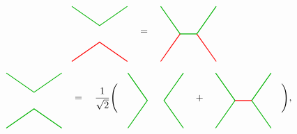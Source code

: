 \documentclass[report,paper=a4, fontsize=12pt, line_length=16cm, number_of_lines=33,dvipdfmx]{jlreq}
\numberwithin{equation}{chapter}
\begin{document}
\begin{align}
    \begin{tikzpicture}[baseline=0]
        \coordinate(A) at (-1,-1);
        \coordinate(B) at (1,-1);
        \coordinate(C) at (1,1);
        \coordinate(D) at (-1,1);
        \draw[darkgreen,thick] (D)--(0,0.3)--(C);
        \draw[red,thick] (A)--(0,-0.3)--(B);
    \end{tikzpicture}
    \quad=
    \quad
    \begin{tikzpicture}[baseline=0]
        \coordinate(A) at (-1,-1);
        \coordinate(B) at (1,-1);
        \coordinate(C) at (1,1);
        \coordinate(D) at (-1,1);
        \draw[darkgreen,thick] (D)--(-0.3,0)--(0.3,0)--(C);
        \draw[red,thick] (A)--(-0.3,0);
        \draw[red,thick] (B)--(0.3,0);
    \end{tikzpicture}
    \quad
\end{align}

\begin{align}
    \begin{tikzpicture}[baseline=0]
        \coordinate(A) at (-1,-1);
        \coordinate(B) at (1,-1);
        \coordinate(C) at (1,1);
        \coordinate(D) at (-1,1);
        \draw[darkgreen,thick] (D)--(0,0.3)--(C);
        \draw[darkgreen,thick] (A)--(0,-0.3)--(B);
    \end{tikzpicture}
    \quad=\quad \frac{1}{\sqrt{2}}\Bigg(
    \quad
    \begin{tikzpicture}[baseline=0]
        \coordinate(A) at (-1,-1);
        \coordinate(B) at (1,-1);
        \coordinate(C) at (1,1);
        \coordinate(D) at (-1,1);
        \draw[darkgreen,thick] (D)--(-0.3,0)--(A);
        \draw[darkgreen,thick] (C)--(0.3,0)--(B);
    \end{tikzpicture}
    \quad
    +
    \quad
    \begin{tikzpicture}[baseline=0]
        \coordinate(A) at (-1,-1);
        \coordinate(B) at (1,-1);
        \coordinate(C) at (1,1);
        \coordinate(D) at (-1,1);
        \draw[darkgreen,thick] (D)--(-0.3,0)--(A);
        \draw[darkgreen,thick] (C)--(0.3,0)--(B);
        \draw[red,thick] (0.3,0)--(-0.3,0);
    \end{tikzpicture}
    \quad
    \Bigg),
\end{align}
\end{document}
